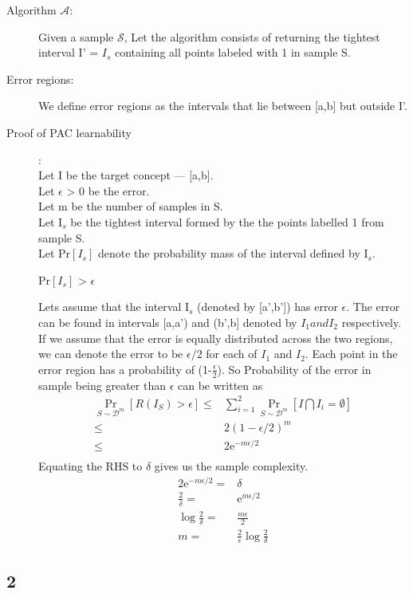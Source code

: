 \documentclass{article}
\begin{document}
\begin{description}
  \item[Algorithm \( \mathcal{A} \):] Given a sample \( \mathcal{S} \), Let the algorithm consists of returning the tightest interval I' = \(I_{s}\) containing all points labeled with 1 in sample S.
  \item[Error regions:] We define error regions as the intervals that lie between [a,b] but outside I'.
  \item[Proof of PAC learnability]:\\
    Let I be the target concept --- [a,b].\\
    Let \( \epsilon \) > 0 be the error.\\
    Let m be the number of samples in S.\\
    Let I\(_{s}\) be the tightest interval formed by the the points labelled 1 from sample S.\\
    Let Pr\([I_{s}]\) denote the probability mass of the interval defined by I\(_{s}\).\\
    \centerline{Pr\([I_{s}]\) > \( \epsilon \)}

    Lets assume that the interval I\(_{s}\) (denoted by [a',b']) has error \(\epsilon\).  The error can be found in intervals [a,a') and (b',b] denoted by \(I_{1} and I_{2} \) respectively.  If we assume that the error is equally distributed across the two regions, we can denote the error to be \(\epsilon/2\) for each of \(I_{1}\) and \(I_{2}\).  Each point in the error region has a probability of (1-\(\frac{\epsilon}{2}\)).  So Probability of the error in sample being greater than \(\epsilon \) can be written as
    \begin{align*}
      \underset{S\sim\mathcal{D}^{m}}{\Pr}[R(I_{S}) > \epsilon] \le & \sum_{i=1}^{2} \underset{S\sim\mathcal{D}^{m}}{\Pr} [{I  \bigcap I_{i} = \emptyset }]\\
      \le & {2( 1 - \epsilon/2)}^{m} \\
      \le & 2\mathrm{e}^{-m\epsilon/2}\\
    \end{align*}
    Equating the RHS to \( \delta \) gives us the sample complexity.
    \begin{align*}
      2\mathrm{e}^{-m\epsilon/2} = & \delta\\
      \frac{2}{\delta} = & \mathrm{e}^{m\epsilon/2} \\
      \log{\frac{2}{\delta}} = & \frac{m\epsilon}{2} \\
      m = & \frac{2}{\epsilon} \log{\frac{2}{\delta}}
    \end{align*}

\end{description}
\newpage
\subsection*{2}
\end{document}
